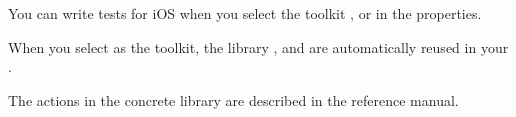 You can write tests for iOS \gdauts{} when you select the toolkit ,  or  in the \gdproject{} properties.

When you select  as the \gdproject{} toolkit, the library \gdprojects{} ,   and  are automatically reused in your \gdproject{}. 


The actions in the concrete library are described in the reference manual.
